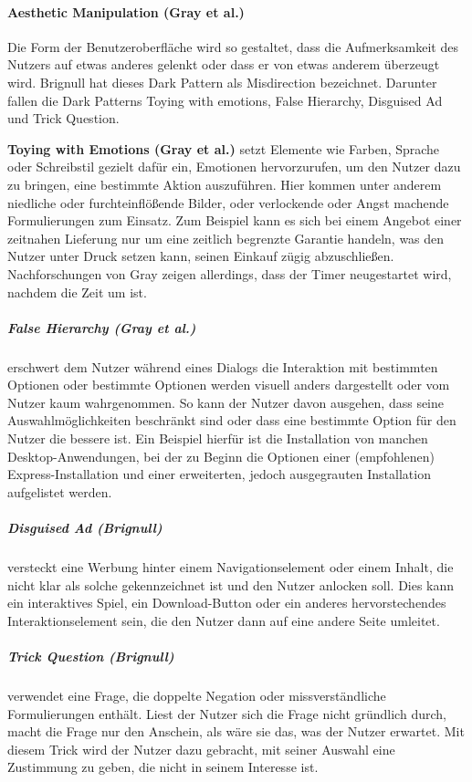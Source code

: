 \documentclass[a4paper]{article}
\begin{document}
\paragraph{Aesthetic Manipulation (Gray et al.)}
Die Form der Benutzeroberfläche wird so gestaltet, dass die Aufmerksamkeit des Nutzers auf etwas anderes gelenkt oder dass er von etwas anderem überzeugt wird. Brignull hat dieses Dark Pattern als \glqq Misdirection\grqq{} bezeichnet. 
Darunter fallen die Dark Patterns Toying with emotions, False Hierarchy, Disguised Ad und Trick Question.\newline

\hspace*{2em}\textbf{Toying with Emotions (Gray et al.)}\newline
setzt Elemente wie Farben, Sprache oder Schreibstil gezielt dafür ein, Emotionen hervorzurufen, um den Nutzer dazu zu bringen, eine bestimmte Aktion auszuführen. Hier kommen unter anderem niedliche oder furchteinflößende Bilder, oder verlockende oder Angst machende Formulierungen zum Einsatz. Zum Beispiel kann es sich bei einem Angebot einer zeitnahen Lieferung nur um eine zeitlich begrenzte Garantie handeln, was den Nutzer unter Druck setzen kann, seinen Einkauf zügig abzuschließen. Nachforschungen von Gray zeigen allerdings, dass der Timer neugestartet wird, nachdem die Zeit um ist. 

\subparagraph{False Hierarchy (Gray et al.)}
erschwert dem Nutzer während eines Dialogs die Interaktion mit bestimmten Optionen oder bestimmte Optionen werden visuell anders dargestellt oder vom Nutzer kaum wahrgenommen. So kann der Nutzer davon ausgehen, dass seine Auswahlmöglichkeiten beschränkt sind oder dass eine bestimmte Option für den Nutzer die bessere ist. Ein Beispiel hierfür ist die Installation von manchen Desktop-Anwendungen, bei der zu Beginn die Optionen einer (empfohlenen) Express-Installation und einer erweiterten, jedoch ausgegrauten Installation aufgelistet werden.

\subparagraph{Disguised Ad (Brignull)}
versteckt eine Werbung hinter einem Navigationselement oder einem Inhalt, die nicht klar als solche gekennzeichnet ist und den Nutzer anlocken soll.
Dies kann ein interaktives Spiel, ein Download-Button oder ein anderes hervorstechendes Interaktionselement sein, die den Nutzer dann auf eine andere Seite umleitet.

\subparagraph{Trick Question (Brignull)}
verwendet eine Frage, die doppelte Negation oder missverständliche Formulierungen enthält. Liest der Nutzer sich die Frage nicht gründlich durch, macht die Frage nur den Anschein, als wäre sie das, was der Nutzer erwartet. Mit diesem Trick wird der Nutzer dazu gebracht, mit seiner Auswahl eine Zustimmung zu geben, die nicht in seinem Interesse ist. 
\end{document}

